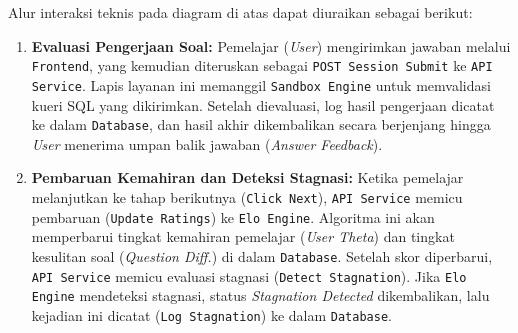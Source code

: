 Alur interaksi teknis pada diagram di atas dapat diuraikan sebagai berikut:
\begin{enumerate}
    \item \textbf{Evaluasi Pengerjaan Soal:}
    Pemelajar (\textit{User}) mengirimkan jawaban melalui \texttt{Frontend}, yang kemudian diteruskan sebagai \texttt{POST Session Submit} ke \texttt{API Service}. Lapis layanan ini memanggil \texttt{Sandbox Engine} untuk memvalidasi kueri SQL yang dikirimkan. Setelah dievaluasi, log hasil pengerjaan dicatat ke dalam \texttt{Database}, dan hasil akhir dikembalikan secara berjenjang hingga \textit{User} menerima umpan balik jawaban (\textit{Answer Feedback}).
    
    \item \textbf{Pembaruan Kemahiran dan Deteksi Stagnasi:}
    Ketika pemelajar melanjutkan ke tahap berikutnya (\texttt{Click Next}), \texttt{API Service} memicu pembaruan (\texttt{Update Ratings}) ke \texttt{Elo Engine}. Algoritma ini akan memperbarui tingkat kemahiran pemelajar (\textit{User Theta}) dan tingkat kesulitan soal (\textit{Question Diff.}) di dalam \texttt{Database}. Setelah skor diperbarui, \texttt{API Service} memicu evaluasi stagnasi (\texttt{Detect Stagnation}). Jika \texttt{Elo Engine} mendeteksi stagnasi, status \textit{Stagnation Detected} dikembalikan, lalu kejadian ini dicatat (\texttt{Log Stagnation}) ke dalam \texttt{Database}.
    

\end{enumerate}
